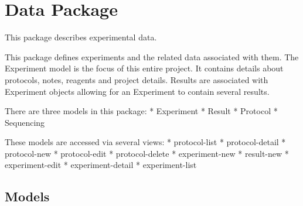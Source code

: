 \documentclass[letterpaper,10pt,english]{sphinxmanual}
\begin{document}
\section{Data Package}
\label{api:module-experimentdb.data}\label{api:data-package}
This package describes experimental data.

This package defines experiments and the related data associated with them.  The Experiment model is the focus of this entire project.  It contains details about protocols, notes, reagents and project details.  Results are associated with Experiment objects allowing for an Experiment to contain several results.

There are three models in this package:
* Experiment
* Result
* Protocol
* Sequencing

These models are accessed via several views:
* protocol-list
* protocol-detail
* protocol-new
* protocol-edit
* protocol-delete
* experiment-new
* result-new
* experiment-edit
* experiment-detail
* experiment-list


\subsection{Models}
\label{api:models}\label{api:module-experimentdb.data.models}
\end{document}
